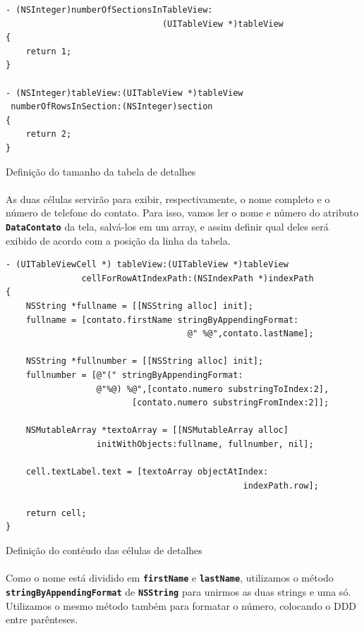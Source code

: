 \documentclass[a4paper,12pt,brazil,doubleside]{book}
\begin{document}
\begin{singlespace}
\begin{listing}[H]
\begin{verbatim}
- (NSInteger)numberOfSectionsInTableView:
                               (UITableView *)tableView
{        
    return 1;
}

- (NSInteger)tableView:(UITableView *)tableView
 numberOfRowsInSection:(NSInteger)section
{
    return 2;
}
\end{verbatim}
\caption{Definição do tamanho da tabela de detalhes}
\end{listing}

\paragraph{}As duas células servirão para exibir, respectivamente, o nome completo e o número de telefone do contato. Para isso, vamos ler o nome e número do atributo \texttt{\textbf{DataContato}} da tela, salvá-los em um array, e assim definir qual deles será exibido de acordo com a posição da linha da tabela.

\begin{listing}[H]
\begin{verbatim}
- (UITableViewCell *) tableView:(UITableView *)tableView
               cellForRowAtIndexPath:(NSIndexPath *)indexPath
{
    NSString *fullname = [[NSString alloc] init];
    fullname = [contato.firstName stringByAppendingFormat:
                                    @" %@",contato.lastName];
    
    NSString *fullnumber = [[NSString alloc] init];
    fullnumber = [@"(" stringByAppendingFormat:
                  @"%@) %@",[contato.numero substringToIndex:2],
                         [contato.numero substringFromIndex:2]];
    
    NSMutableArray *textoArray = [[NSMutableArray alloc]
                  initWithObjects:fullname, fullnumber, nil];

    cell.textLabel.text = [textoArray objectAtIndex:
                                               indexPath.row];
    
    return cell;
}
\end{verbatim}
\caption{Definição do contéudo das células de detalhes}
\end{listing}

\paragraph{}Como o nome está dividido em \texttt{\textbf{firstName}} e \texttt{\textbf{lastName}}, utilizamos o método\\
\texttt{\textbf{stringByAppendingFormat}} de \texttt{\textbf{NSString}} para unirmos as duas strings e uma só. Utilizamos o mesmo método também para formatar o número, colocando o DDD entre parênteses.

\end{singlespace}
\end{document}
